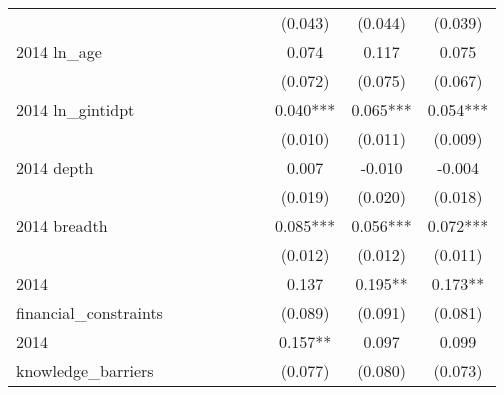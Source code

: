 \begin{table}[htbp]
\begin{tabular}{l*{9}{c}}
                    &               &               &               &               &               &               &     (0.043)   &     (0.044)   &     (0.039)   \\
2014 ln\_age         &               &               &               &               &               &               &       0.074   &       0.117   &       0.075   \\
                    &               &               &               &               &               &               &     (0.072)   &     (0.075)   &     (0.067)   \\
2014 ln\_gintidpt    &               &               &               &               &               &               &       0.040***&       0.065***&       0.054***\\
                    &               &               &               &               &               &               &     (0.010)   &     (0.011)   &     (0.009)   \\
2014 depth          &               &               &               &               &               &               &       0.007   &      -0.010   &      -0.004   \\
                    &               &               &               &               &               &               &     (0.019)   &     (0.020)   &     (0.018)   \\
2014 breadth        &               &               &               &               &               &               &       0.085***&       0.056***&       0.072***\\
                    &               &               &               &               &               &               &     (0.012)   &     (0.012)   &     (0.011)   \\
2014                &               &               &               &               &               &               &       0.137   &       0.195** &       0.173** \\
financial\_constraints&               &               &               &               &               &               &     (0.089)   &     (0.091)   &     (0.081)   \\
2014                &               &               &               &               &               &               &       0.157** &       0.097   &       0.099   \\
knowledge\_barriers  &               &               &               &               &               &               &     (0.077)   &     (0.080)   &     (0.073)   \\

\end{tabular}
\end{table}
